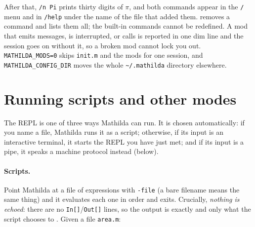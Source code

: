 \noindent
After that, \texttt{/n Pi} prints thirty digits of \(\pi\), and both commands appear
in the \texttt{/} menu and in \texttt{/help} under the name of the file that added
them.  removes a command and
 lists them all; the built-in commands cannot be redefined. A
mod that emits messages, is interrupted, or calls  is reported in one
dim line and the session goes on without it, so a broken mod cannot lock you out.
\texttt{MATHILDA\_MODS=0} skips \texttt{init.m} and the mods for one session, and
\texttt{MATHILDA\_CONFIG\_DIR} moves the whole \texttt{\textasciitilde/.mathilda} directory
elsewhere.%

\section{Running scripts and other modes}
\label{sec:scripts}

The REPL is one of three ways Mathilda can run. It is chosen automatically: if you
name a file, Mathilda runs it as a script; otherwise, if its input is an interactive
terminal, it starts the REPL you have just met; and if its input is a pipe, it speaks
a machine protocol instead (below).

\paragraph{Scripts.} Point Mathilda at a file of expressions with \texttt{-file} (a
bare filename means the same thing) and it evaluates each one in order and exits.
Crucially, \emph{nothing is echoed}: there are no \texttt{In[]}/\texttt{Out[]} lines,
so the output is exactly and only what the script chooses to . Given a file
\texttt{area.m}:

